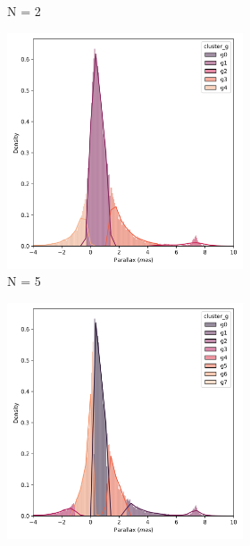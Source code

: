 \documentclass[11pt,a4paper,USenglish,twocolumn]{article}
\begin{document}
\begin{figure}[htbp]
\begin{subfigure}{\columnwidth}
\begin{subfigure}[t]{0.3\textwidth}
      \caption{N = 2}
    \end{subfigure}
    \hfill
    \begin{subfigure}[t]{0.3\textwidth}
      \centering
      \includegraphics[width=\textwidth]{../figures/kmeans/kmeans_n5_parallax_melotte_22.png}
      \caption{N = 5}
    \end{subfigure}
    \hfill
    \begin{subfigure}[t]{0.3\textwidth}
      \centering
      \includegraphics[width=\textwidth]{../figures/kmeans/kmeans_n8_parallax_melotte_22.png}

\end{subfigure}
\end{subfigure}
\end{figure}
\end{document}
